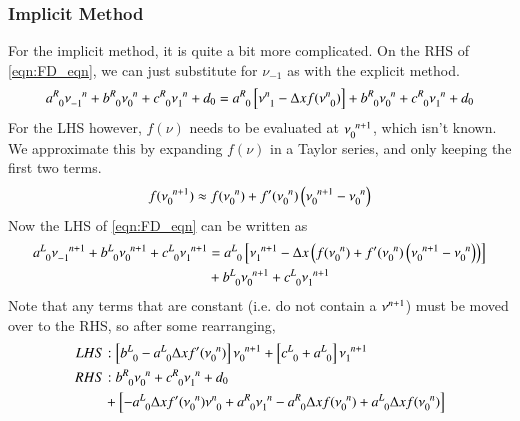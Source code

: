 \documentclass[letterpaper,12pt]{article}
\newcommand \bcf{f}
\begin{document}
\subsubsection{Implicit Method}
For the implicit method, it is quite a bit more complicated.
On the RHS of \ref{eqn:FD_eqn}, we can just substitute for $\nu_{-1}$ as with the explicit method.
\begin{equation}
  \label{eqn:lhs}
  a\indices{^R_0} \nu\indices{_{-1}^{n  }}
+ b\indices{^R_0} \nu\indices{_{ 0}^{n  }}
+ c\indices{^R_0} \nu\indices{_{ 1}^{n  }}
+ d_0
=
  a\indices{^R_0} \left[\nu\indices{^{n}_{1}} - \Delta x \bcf(\nu\indices{^{n}_{0}})\right]
+ b\indices{^R_0} \nu\indices{_{ 0}^{n  }}
+ c\indices{^R_0} \nu\indices{_{ 1}^{n  }}
+ d_0
\end{equation}
For the LHS however, $\bcf\left(\nu\right)$ needs to be evaluated at $\nu\indices{_{0}^{n+1}}$, which isn't known. We approximate this by expanding $\bcf\left(\nu\right)$ in a Taylor series, and only keeping the first two terms.
\begin{equation}
  \bcf(\nu\indices{_{0}^{n+1}}) \approx \bcf (\nu\indices{_{0}^{n}})
                                      +  \bcf'(\nu\indices{_{0}^{n}}) \left( \nu\indices{_{0}^{n+1}} - \nu\indices{_{0}^{n}} \right)
\end{equation}
Now the LHS of \ref{eqn:FD_eqn} can be written as
\begin{align}
  \label{eqn:rhs}
  a\indices{^L_0} \nu\indices{_{-1}^{n+1}}
+ b\indices{^L_0} \nu\indices{_{0 }^{n+1}}
+ c\indices{^L_0} \nu\indices{_{ 1}^{n+1}}
&=
a\indices{^L_0} \left[ \nu\indices{_{1}^{n+1}}
                    - \Delta x \left(\bcf (\nu\indices{_{0}^{n}})
                               +     \bcf'(\nu\indices{_{0}^{n}}) \left( \nu\indices{_{0}^{n+1}} - \nu\indices{_{0}^{n}} \right) \right)
               \right] \nonumber \\
&+ b\indices{^L_0} \nu\indices{_{0  }^{n+1}}
 + c\indices{^L_0} \nu\indices{_{  1}^{n+1}}
\end{align}
Note that any terms that are constant (i.e. do not contain a $\nu\indices{^{n+1}}$) must be moved over to the RHS, so after
some rearranging,
\begin{align}
  \label{eqn:minLHS}
  LHS&: 
  \left[b\indices{^L_0} - a\indices{^L_0}\Delta x \bcf'(\nu\indices{_{0}^n}) \right] \nu\indices{_0^{n+1}}
+ \left[c\indices{^L_0} + a\indices{^L_0}                                             \right] \nu\indices{_1^{n+1}} \\
  \label{eqn:minRHS}
  RHS&:
  b\indices{^R_0}\nu\indices{_0^n}
+ c\indices{^R_0}\nu\indices{_1^n}
+ d_0 \nonumber \\
&+
\left[
- a\indices{^L_0} \Delta x \bcf'(\nu\indices{_0^n}) \nu\indices{^n_0}
+ a\indices{^R_0}                 \nu\indices{_1^n} 
- a\indices{^R_0} \Delta x \bcf (\nu\indices{_0^n})
+ a\indices{^L_0} \Delta x \bcf (\nu\indices{_0^n})
\right]
\end{align}
\end{document}
